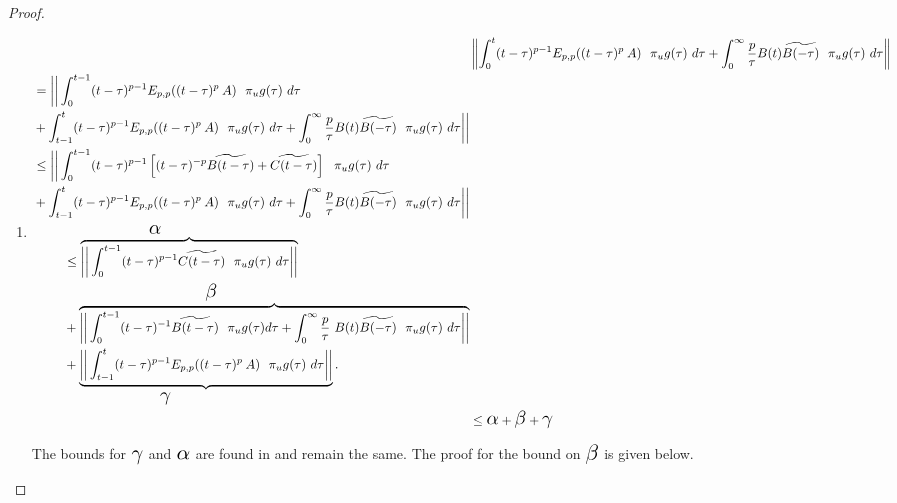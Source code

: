 \begin{proof}
\begin{enumerate}
\item 
\footnotesize{
\begin{align*}	
	&\left\| \int_{0}^{t} (t-\tau)^{p-1} \Gml{p,p}{(t-\tau)^p}{A}~~ \pi_ug(\tau) ~d\tau + \int_{0}^{\infty}\frac{p}{\tau} B(t)\widetilde{B(-\tau)}~~\pi_ug(\tau)~ d\tau\right\| \\
	 \begin{split} &= \bigg|\bigg|\int_{0}^{t-1}(t-\tau)^{p-1} \Gml{p,p}{(t-\tau)^p}{A}~~ \pi_ug(\tau) ~d\tau  \\
	&+ \int_{t-1}^{t}(t-\tau)^{p-1} \Gml{p,p}{(t-\tau)^p}{A}~~ \pi_ug(\tau) ~d\tau  
	+ \int_{0}^{\infty}\frac{p}{\tau} B(t)\widetilde{B(-\tau)}~~\pi_ug(\tau) ~d\tau \bigg|\bigg|
	\end{split}\\
	\begin{split}
&\leq \bigg|\bigg| \int_{0}^{t-1}(t-\tau)^{p-1} \left[ (t- \tau)^{-p} \widetilde{B(t-\tau)} + \widetilde{C(t-\tau)} \right] ~~ \pi_ug(\tau) ~d\tau \\&+ \int_{t-1}^{t}(t-\tau)^{p-1} \Gml{p,p}{(t-\tau)^p}{A}~~ \pi_ug(\tau) ~d\tau + \int_{0}^{\infty}\frac{p}{\tau} B(t)\widetilde{B(-\tau)}~~\pi_ug(\tau) ~d\tau\bigg|\bigg|
\end{split}\\ 
\begin{split}
&\leq \overbrace{\bigg|\bigg| \int_{0}^{t-1} (t-\tau)^{p-1} \widetilde{C(t-\tau)} ~~ \pi_ug(\tau)~ d\tau \bigg|\bigg|}^{\Scale[1.5]{\alpha}} \\&+ \overbrace{\bigg|\bigg| \int_{0}^{t-1} (t-\tau)^{-1}\widetilde{B(t-\tau)} ~~ \pi_ug(\tau) d\tau + \int_{0}^{\infty}\frac{p}{\tau} ~B(t)\widetilde{B(-\tau)}~~\pi_ug(\tau) ~d\tau\bigg|\bigg|}^{\Scale[1.5]{\beta}} \\&+ \underbrace{\bigg|\bigg| \int_{t-1}^{t} (t-\tau)^{p-1} \Gml{p,p}{(t-\tau)^{p}}{A}~~ \pi_ug(\tau) ~d\tau \bigg|\bigg|}_{\Scale[1.5]{\gamma}}.
\end{split}\\
& \leq \Scale[1.5]{\alpha}+\Scale[1.5]{\beta}+\Scale[1.5]{\gamma}  
\end{align*} 
}

The bounds for $\Scale[1.5]{\gamma}$ and $\Scale[1.5]{\alpha}$ are found in \citep[eqn. (70) and eqn. (58)]{deshpande2016local} and remain the same. The proof for the bound on $\Scale[1.5]{\beta}$ is given below.  


\end{enumerate}
\end{proof}
